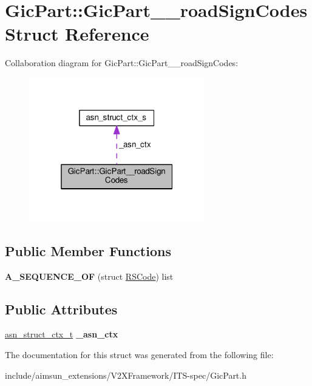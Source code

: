 \hypertarget{structGicPart_1_1GicPart____roadSignCodes}{}\section{Gic\+Part\+:\+:Gic\+Part\+\_\+\+\_\+road\+Sign\+Codes Struct Reference}
\label{structGicPart_1_1GicPart____roadSignCodes}


Collaboration diagram for Gic\+Part\+:\+:Gic\+Part\+\_\+\+\_\+road\+Sign\+Codes\+:\nopagebreak
\begin{figure}[H]
\begin{center}
\leavevmode
\includegraphics[width=217pt]{structGicPart_1_1GicPart____roadSignCodes__coll__graph}
\end{center}
\end{figure}
\subsection*{Public Member Functions}
\begin{DoxyCompactItemize}
\item 
{\bfseries A\+\_\+\+S\+E\+Q\+U\+E\+N\+C\+E\+\_\+\+OF} (struct \hyperlink{structRSCode}{R\+S\+Code}) list\hypertarget{structGicPart_1_1GicPart____roadSignCodes_a5e3c96e8923717f01ce67c615defe2cd}{}\label{structGicPart_1_1GicPart____roadSignCodes_a5e3c96e8923717f01ce67c615defe2cd}

\end{DoxyCompactItemize}
\subsection*{Public Attributes}
\begin{DoxyCompactItemize}
\item 
\hyperlink{structasn__struct__ctx__s}{asn\+\_\+struct\+\_\+ctx\+\_\+t} {\bfseries \+\_\+asn\+\_\+ctx}\hypertarget{structGicPart_1_1GicPart____roadSignCodes_a632e16b723304b0eaf8075aa67b8db05}{}\label{structGicPart_1_1GicPart____roadSignCodes_a632e16b723304b0eaf8075aa67b8db05}

\end{DoxyCompactItemize}


The documentation for this struct was generated from the following file\+:\begin{DoxyCompactItemize}
\item 
include/aimsun\+\_\+extensions/\+V2\+X\+Framework/\+I\+T\+S-\/spec/Gic\+Part.\+h\end{DoxyCompactItemize}

